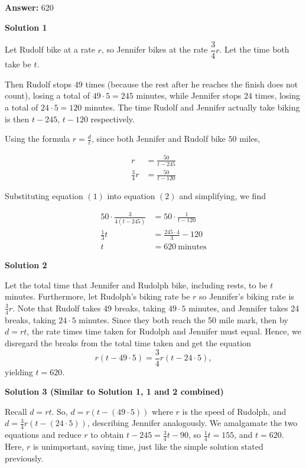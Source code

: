 \begin{enumerate}
 
 \textbf{Answer: }620



\textbf{Solution 1}

Let Rudolf bike at a rate $r$, so Jennifer bikes at the rate $\dfrac 34r$. Let the time both take be $t$. 

 Then Rudolf stops $49$ times (because the rest after he reaches the finish does not count), losing a total of $49 \cdot 5 = 245$ minutes, while Jennifer stops $24$ times, losing a total of $24 \cdot 5 = 120$ minutes. The time Rudolf and Jennifer actually take biking is then $t - 245,\, t-120$ respectively. 

 Using the formula $r = \frac dt$, since both Jennifer and Rudolf bike $50$ miles,

 
 \begin{align}r &= \frac{50}{t-245}\\ \frac{3}{4}r &= \frac{50}{t-120} \end{align}

 Substituting equation $(1)$ into equation $(2)$ and simplifying, we find 

 
 \begin{align*}50 \cdot \frac{3}{4(t-245)} &= 50 \cdot \frac{1}{t-120}\\ \frac{1}{3}t &= \frac{245 \cdot 4}{3} - 120\\ t &= \boxed{620}\ \text{minutes} \end{align*}





\textbf{Solution 2}

Let the total time that Jennifer and Rudolph bike, including rests, to be $t$ minutes.  Furthermore, let Rudolph's biking rate be $r$ so Jennifer's biking rate is $\frac{3}{4}r$. Note that Rudolf takes 49 breaks, taking $49\cdot 5$ minutes, and Jennifer takes 24 breaks, taking $24\cdot 5$ minutes.  Since they both reach the 50 mile mark, then by $d=rt$, the rate times time taken for Rudolph and Jennifer must equal.  Hence, we disregard the breaks from the total time taken and get the equation  
 \[r(t-49\cdot 5)=\frac{3}{4}r(t-24\cdot 5),\]yielding $t=\boxed{620}$.

 



\textbf{Solution 3 (Similar to Solution 1, 1 and 2 combined)}

Recall $d=rt$. So, $d = r(t-(49\cdot 5))$ where $r$ is the speed of Rudolph, and $d=\frac{3}{4}r(t-(24 \cdot 5))$, describing Jennifer analogously. We amalgamate the two equations and reduce $r$ to obtain $t-245 = \frac{3}{4}t - 90$, so $\frac{1}{4}t = 155$, and $t = \boxed{620}$. Here, $r$ is unimportant, saving time, just like the simple solution stated previously.


\end{enumerate}
